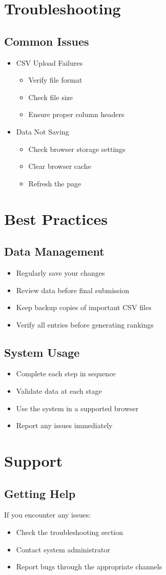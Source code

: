 \documentclass[12pt,a4paper]{article}
\begin{document}
\section{Troubleshooting}
\subsection{Common Issues}
\begin{itemize}
    \item CSV Upload Failures
    \begin{itemize}
        \item Verify file format
        \item Check file size
        \item Ensure proper column headers
    \end{itemize}
    \item Data Not Saving
    \begin{itemize}
        \item Check browser storage settings
        \item Clear browser cache
        \item Refresh the page
    \end{itemize}
\end{itemize}

\section{Best Practices}
\subsection{Data Management}
\begin{itemize}
    \item Regularly save your changes
    \item Review data before final submission
    \item Keep backup copies of important CSV files
    \item Verify all entries before generating rankings
\end{itemize}

\subsection{System Usage}
\begin{itemize}
    \item Complete each step in sequence
    \item Validate data at each stage
    \item Use the system in a supported browser
    \item Report any issues immediately
\end{itemize}

\section{Support}
\subsection{Getting Help}
If you encounter any issues:
\begin{itemize}
    \item Check the troubleshooting section
    \item Contact system administrator
    \item Report bugs through the appropriate channels
\end{itemize}
\end{document}

